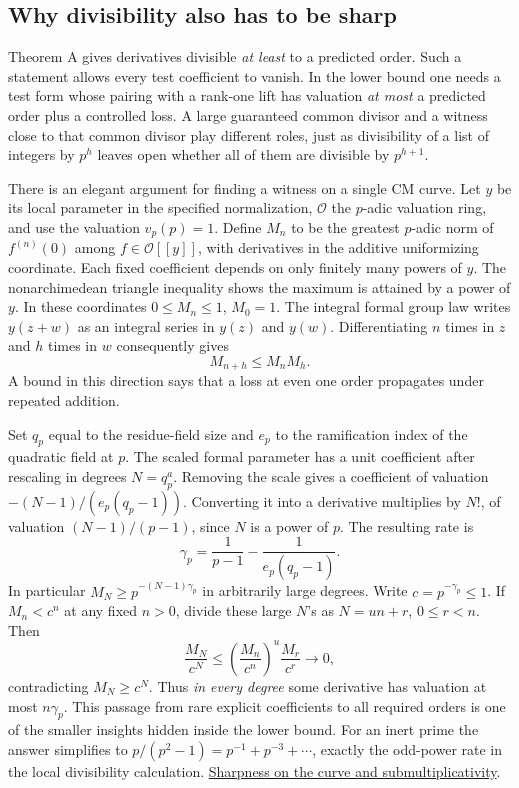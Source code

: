 \documentclass[11pt,letterpaper]{article}
\newcommand{\sref}[2]{\href{https://github.com/VladimirReshetnikov/ProveIt/blob/d8415e76ad850651f8c0083afe689dd9f4a45a10/Analysis/GeneralizedRiemannHypothesis/vendor/grh-lean/grh/src/#1.lean}{#2}}
\begin{document}
\subsection{Why divisibility also has to be sharp}

Theorem A gives derivatives divisible \emph{at least} to a predicted order. Such a statement allows every test coefficient to vanish. In the lower bound one needs a test form whose pairing with a rank-one lift has valuation \emph{at most} a predicted order plus a controlled loss. A large guaranteed common divisor and a witness close to that common divisor play different roles, just as divisibility of a list of integers by \(p^h\) leaves open whether all of them are divisible by \(p^{h+1}\).

There is an elegant argument for finding a witness on a single CM curve. Let \(y\) be its local parameter in the specified normalization, \(\mathcal O\) the \(p\)-adic valuation ring, and use the valuation \(v_p(p)=1\). Define \(M_n\) to be the greatest \(p\)-adic norm of \(f^{(n)}(0)\) among \(f\in\mathcal O[[y]]\), with derivatives in the additive uniformizing coordinate. Each fixed coefficient depends on only finitely many powers of \(y\). The nonarchimedean triangle inequality shows the maximum is attained by a power of \(y\). In these coordinates \(0\le M_n\le1\), \(M_0=1\). The integral formal group law writes \(y(z+w)\) as an integral series in \(y(z)\) and \(y(w)\). Differentiating \(n\) times in \(z\) and \(h\) times in \(w\) consequently gives
\[
                              M_{n+h}\le M_n M_h .
\]
A bound in this direction says that a loss at even one order propagates under repeated addition.

Set \(q_p\) equal to the residue-field size and \(e_p\) to the ramification index of the quadratic field at \(p\). The scaled formal parameter has a unit coefficient after rescaling in degrees \(N=q_p^a\). Removing the scale gives a coefficient of valuation \(-(N-1)/(e_p(q_p-1))\). Converting it into a derivative multiplies by \(N!\), of valuation \((N-1)/(p-1)\), since \(N\) is a power of \(p\). The resulting rate is
\[
            \gamma_p=\frac{1}{p-1}-\frac{1}{e_p(q_p-1)} .
\]
In particular \(M_N\ge p^{-(N-1)\gamma_p}\) in arbitrarily large degrees. Write \(c=p^{-\gamma_p}\le1\). If \(M_n<c^n\) at any fixed \(n>0\), divide these large \(N\)'s as \(N=un+r\), \(0\le r<n\). Then
\[
        \frac{M_N}{c^N}\le
        \left(\frac{M_n}{c^n}\right)^u\frac{M_r}{c^r}\longrightarrow0 ,
\]
contradicting \(M_N\ge c^N\). Thus \emph{in every degree} some derivative has valuation at most \(n\gamma_p\). This passage from rare explicit coefficients to all required orders is one of the smaller insights hidden inside the lower bound. For an inert prime the answer simplifies to \(p/(p^2-1)=p^{-1}+p^{-3}+\cdots\), exactly the odd-power rate in the local divisibility calculation. \sref{New/Derivatives/Sharpness/OneCurve}{Sharpness on the curve and submultiplicativity}.
\end{document}
